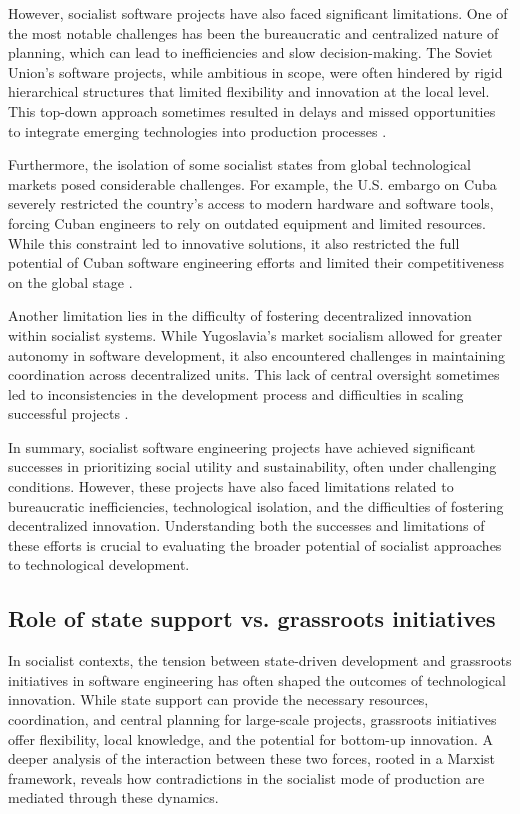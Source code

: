 \begin{refsection}
However, socialist software projects have also faced significant limitations. One of the most notable challenges has been the bureaucratic and centralized nature of planning, which can lead to inefficiencies and slow decision-making. The Soviet Union’s software projects, while ambitious in scope, were often hindered by rigid hierarchical structures that limited flexibility and innovation at the local level. This top-down approach sometimes resulted in delays and missed opportunities to integrate emerging technologies into production processes \cite[pp.~102-105]{gerovitch2002}. 

Furthermore, the isolation of some socialist states from global technological markets posed considerable challenges. For example, the U.S. embargo on Cuba severely restricted the country’s access to modern hardware and software tools, forcing Cuban engineers to rely on outdated equipment and limited resources. While this constraint led to innovative solutions, it also restricted the full potential of Cuban software engineering efforts and limited their competitiveness on the global stage \cite[pp.~67-70]{feinberg2016}.

Another limitation lies in the difficulty of fostering decentralized innovation within socialist systems. While Yugoslavia’s market socialism allowed for greater autonomy in software development, it also encountered challenges in maintaining coordination across decentralized units. This lack of central oversight sometimes led to inconsistencies in the development process and difficulties in scaling successful projects \cite[pp.~112-115]{djilas1957}.

In summary, socialist software engineering projects have achieved significant successes in prioritizing social utility and sustainability, often under challenging conditions. However, these projects have also faced limitations related to bureaucratic inefficiencies, technological isolation, and the difficulties of fostering decentralized innovation. Understanding both the successes and limitations of these efforts is crucial to evaluating the broader potential of socialist approaches to technological development.

\subsection{Role of state support vs. grassroots initiatives}

In socialist contexts, the tension between state-driven development and grassroots initiatives in software engineering has often shaped the outcomes of technological innovation. While state support can provide the necessary resources, coordination, and central planning for large-scale projects, grassroots initiatives offer flexibility, local knowledge, and the potential for bottom-up innovation. A deeper analysis of the interaction between these two forces, rooted in a Marxist framework, reveals how contradictions in the socialist mode of production are mediated through these dynamics.


\end{refsection}
